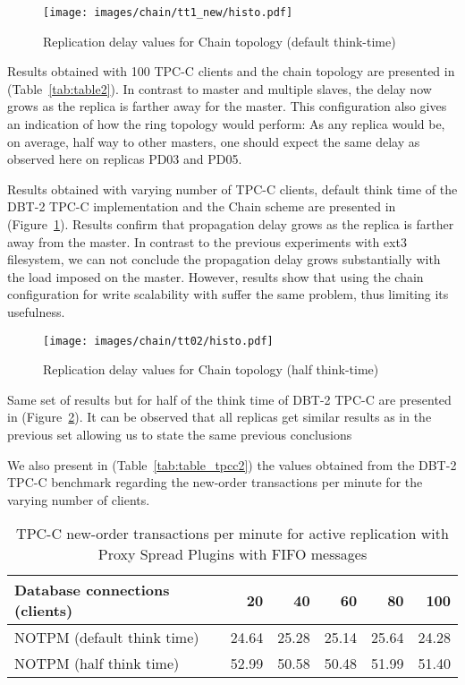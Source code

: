 \begin{figure}[t]
\centering    
\texttt{[image: images/chain/tt1\_new/histo.pdf]}
\caption{Replication delay values for Chain topology (default think-time)}
\label{fig:chain_tt1}
\end{figure}

Results obtained with 100 TPC-C clients and the chain topology are presented in (Table~\ref{tab:table2}). In contrast to master and multiple slaves, the delay now grows as the replica is farther away for the master. This configuration also gives an indication of how the ring topology would perform: As any replica would be, on average, half way to other masters, one should expect the same delay as observed here on replicas PD03 and PD05.

Results obtained with varying number of TPC-C clients, default think time of the DBT-2 TPC-C implementation and the Chain scheme are presented in (Figure~\ref{fig:chain_tt1}). Results confirm that propagation delay grows as the replica is farther away from the master. In contrast to the previous experiments with ext3 filesystem, we can not conclude the propagation delay grows substantially with the load imposed on the master. However, results show that using the chain configuration for write scalability with suffer the same problem, thus limiting its usefulness.

\begin{figure}[t]
\centering    
\texttt{[image: images/chain/tt02/histo.pdf]}
\caption{Replication delay values for Chain topology (half think-time)}
\label{fig:chain_tt02}
\end{figure}


Same set of results but for half of the think time of DBT-2 TPC-C are presented in (Figure~\ref{fig:chain_tt02}). It can be observed that all replicas get similar results as in the previous set allowing us to state the same previous conclusions

We also present in (Table~\ref{tab:table_tpcc2}) the values obtained from the DBT-2 TPC-C benchmark regarding the new-order transactions per minute for the varying number of clients.



\clearpage




\begin{table}[h]
\centering    
\begin{tabular}{lrrrrr}
 \hline\hline
Database connections (clients) & 20 & 40 & 60 & 80 & 100 \\
\hline
NOTPM (default think time) & 24.64 & 25.28 & 25.14 & 25.64 & 24.28 \\
NOTPM (half think time) & 52.99 & 50.58 & 50.48 & 51.99 & 51.40 \\
\hline
\end{tabular}

~\\
\caption{TPC-C new-order transactions per minute for active replication with Proxy Spread Plugins with FIFO messages}
\label{tab:table_tpcc3}
\end{table}


